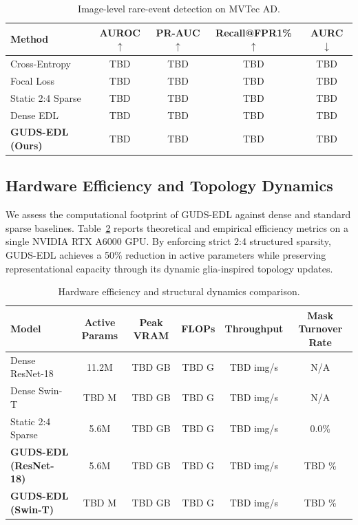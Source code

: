 \documentclass[letterpaper]{article} %
\begin{document}
\begin{table}[!ht]
\centering
\caption{Image-level rare-event detection on MVTec AD.}
\label{tab:mvtec_ad}
\begin{tabular}{l ccc c}
\toprule
\textbf{Method} & \textbf{AUROC} $\uparrow$ & \textbf{PR-AUC} $\uparrow$ & \textbf{Recall@FPR1\%} $\uparrow$ & \textbf{AURC} $\downarrow$ \\
\midrule
Cross-Entropy      & TBD & TBD & TBD & TBD \\
Focal Loss         & TBD & TBD & TBD & TBD \\
Static 2:4 Sparse  & TBD & TBD & TBD & TBD \\
Dense EDL          & TBD & TBD & TBD & TBD \\
\midrule
\textbf{GUDS-EDL (Ours)} & TBD & TBD & TBD & TBD \\
\bottomrule
\end{tabular}
\end{table}

\subsection{Hardware Efficiency and Topology Dynamics}\label{subsec:efficiency}
We assess the computational footprint of GUDS-EDL against dense and standard sparse baselines. Table~\ref{tab:hardware_efficiency} reports theoretical and empirical efficiency metrics on a single NVIDIA RTX A6000 GPU. By enforcing strict 2:4 structured sparsity, GUDS-EDL achieves a 50\% reduction in active parameters while preserving representational capacity through its dynamic glia-inspired topology updates.

\begin{table}[!ht]
\centering
\caption{Hardware efficiency and structural dynamics comparison.}
\label{tab:hardware_efficiency}
\begin{tabular}{l ccc cc}
\toprule
\textbf{Model} & \textbf{Active Params} & \textbf{Peak VRAM} & \textbf{FLOPs} & \textbf{Throughput} & \textbf{Mask Turnover Rate} \\
\midrule
Dense ResNet-18   & 11.2M & TBD GB & TBD G & TBD img/s & N/A \\
Dense Swin-T      & TBD M & TBD GB & TBD G & TBD img/s & N/A \\
Static 2:4 Sparse & 5.6M  & TBD GB & TBD G & TBD img/s & 0.0\% \\
\midrule
\textbf{GUDS-EDL (ResNet-18)} & 5.6M & TBD GB & TBD G & TBD img/s & TBD \% \\
\textbf{GUDS-EDL (Swin-T)}    & TBD M & TBD GB & TBD G & TBD img/s & TBD \% \\
\bottomrule
\end{tabular}
\end{table}
\end{document}
